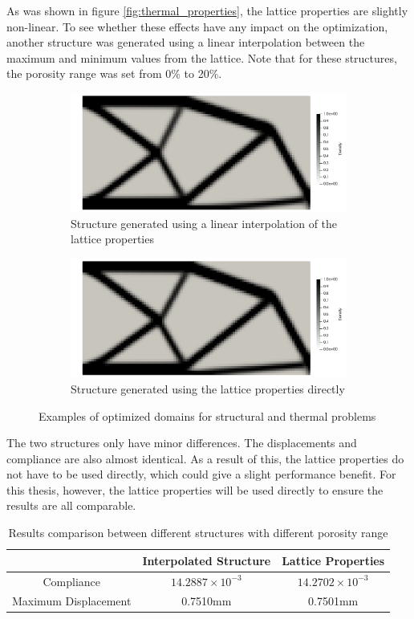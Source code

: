 As was shown in figure \ref{fig:thermal_properties}, the lattice properties are slightly non-linear. To see whether these effects have any impact on the optimization, another structure was generated using a linear interpolation between the maximum and minimum values from the lattice. Note that for these structures, the porosity range was set from 0\% to 20\%.
\begin{figure}[ht]
  \centering
  \begin{subfigure}[b]{0.47\linewidth}
      \includegraphics[width=\linewidth]{figures/chapter_4/StructuralOptGenericOrtho.png}
      \caption{Structure generated using a linear interpolation of the lattice properties}
  \end{subfigure}
  \hfill
  \begin{subfigure}[b]{0.47\linewidth}
      \includegraphics[width=\linewidth]{figures/chapter_4/StructuralOptLattice0to20.png}
      \caption{Structure generated using the lattice properties directly}
  \end{subfigure}
  \caption{Examples of optimized domains for structural and thermal problems}
\end{figure}

The two structures only have minor differences. The displacements and compliance are also almost identical. As a result of this, the lattice properties do not have to be used directly, which could give a slight performance benefit. For this thesis, however, the lattice properties will be used directly to ensure the results are all comparable.
\begin{table}[ht]
  \centering
  \begin{tabular}{c | c | c}
    & Interpolated Structure & Lattice Properties \\
    \hline
    Compliance & $14.2887\times10^{-3}$ & $14.2702\times10^{-3}$ \\
    \hline
    Maximum Displacement & 0.7510mm & 0.7501mm
  \end{tabular}
  \caption{Results comparison between different structures with different porosity range}
\end{table}


